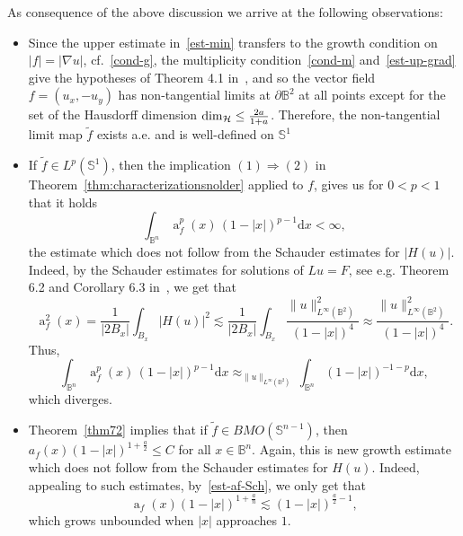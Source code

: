 \documentclass[11pt,a4paper,reqno]{amsart}
\theoremstyle{definition}
\renewcommand{\a}{\operatorname{a}}
\newcommand{\B}{\mathbb{B}^n}
\newcommand{\BB}{\mathbb{B}^2}
\newcommand{\ud}{\mathrm {d}}
\newcommand{\Sn}{\mathbb{S}^{n-1}}
\numberwithin{komcounter}{section}
\begin{document}
As consequence of the above discussion we arrive at the following observations:
\begin{itemize}
\item[(1)]
Since the upper estimate in~\eqref{est-min} transfers to the growth condition on $|f|=|\nabla u|$, cf.~\eqref{cond-g}, the multiplicity condition~\eqref{cond-m} and~\eqref{est-up-grad} give the hypotheses of Theorem 4.1 in~\cite{kmv}, and so the vector field $f=(u_x, -u_y)$ has non-tangential limits at $\partial \BB$ at all points except for the set of the Hausdorff dimension ${\rm dim}_{\mathcal{H}}\leq \frac{2a}{1+a}$. Therefore, the non-tangential limit map $\tilde{f}$ exists a.e. and is well-defined on $\mathbb{S}^1$ 
\item[(2)] If $\tilde{f}\in L^p(\mathbb{S}^1)$, then the implication $(1)\Rightarrow (2)$ in Theorem~\ref{thm:characterizationsnolder} applied to $f$, gives us for $0<p<1$ that it holds 
$$
\int_{\B}\a_f^p(x)\, (1-|x|)^{p-1}\ud x<\infty,
$$
the estimate which does not follow from the Schauder estimates for $|H(u)|$. Indeed, by the Schauder estimates for solutions of $Lu=F$, see e.g. Theorem 6.2 and Corollary 6.3 in~\cite{gt}, we get that 
\begin{equation}\label{est-af-Sch}
 \a_f^2(x)=\frac{1}{|2B_x|} \int_{B_x}|H(u)|^2 \lesssim \frac{1}{|2B_x|} \int_{B_x} \frac{\|u\|^2_{L^{\infty}(\BB)}}{(1-|x|)^4}\approx \frac{\|u\|^2_{L^{\infty}(\BB)}}{(1-|x|)^4}.
\end{equation}
Thus, 
\[
 \int_{\B}\a_f^p(x)\, (1-|x|)^{p-1}\ud x \approx_{\|u\|_{L^{\infty}(\BB)}} \int_{\B} (1-|x|)^{-1-p}\ud x,
\]
which diverges.
\item[(3)] Theorem~\ref{thm72} implies that if $\tilde{f}\in BMO(\Sn)$, then $a_f(x)(1-|x|)^{1+\frac{a}{2}}\leq C$  for all $x \in \B$. Again, this is new growth estimate which does not follow from the Schauder estimates for $H(u)$. Indeed, appealing to such estimates, by~\eqref{est-af-Sch}, we only get that
\[
\a_f(x)(1-|x|)^{1+\frac{a}{n}}\lesssim (1-|x|)^{\frac{a}{2}-1},
\]
which grows unbounded when $|x|$ approaches $1$.
\end{itemize}
\end{document}
